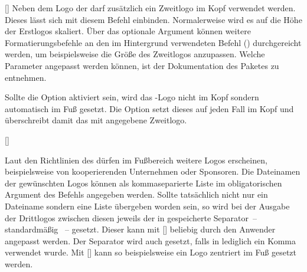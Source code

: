 \begin{Declaration*}{}
\begin{Declaration*}{}
\begin{Declaration*}{}
\begin{Declaration}{[\LParameter{}]}
\printdeclarationlist%
%
%
%
%
Neben dem Logo der \TnUD darf zusätzlich ein Zweitlogo im Kopf verwendet 
werden. Dieses lässt sich mit diesem Befehl einbinden. Normalerweise wird es 
auf die Höhe der Erstlogos skaliert. Über das optionale Argument können weitere 
Formatierungsbefehle an den im Hintergrund verwendeten Befehl 
() durchgereicht werden, um 
beispielsweise die Größe des Zweitlogos anzupassen. Welche Parameter angepasst 
werden können, ist der Dokumentation des Paketes  zu 
entnehmen.

Sollte die Option  aktiviert sein, wird das \DDC-Logo nicht im Kopf 
sondern automatisch im Fuß gesetzt. Die Option  setzt dieses 
auf jeden Fall im Kopf und überschreibt damit das mit  
angegebene Zweitlogo.
\end{Declaration}

\begin{Declaration}[v2.03]{%
  [\LParameter{}]%
}
\begin{Declaration}[v2.03]{}%
\printdeclarationlist%
%
%
%

Laut den Richtlinien des \CDs dürfen im Fußbereich weitere Logos erscheinen, 
beispielsweise von kooperierenden Unternehmen oder Sponsoren. Die Dateinamen 
der gewünschten Logos können als kommaseparierte Liste im obligatorischen 
Argument des Befehls  angegeben werden. Sollte tatsächlich 
nicht nur ein Dateiname sondern eine Liste übergeben worden sein, so wird bei 
der Ausgabe der Drittlogos zwischen diesen jeweils der in  
gespeicherte Separator~-- standardmäßig ~-- gesetzt. Dieser kann 
mit [\PParameter{\dots}] 
beliebig durch den Anwender angepasst werden. Der Separator wird auch gesetzt, 
falls in  lediglich ein Komma verwendet wurde. Mit 
[] kann so beispielsweise ein 
Logo zentriert im Fuß gesetzt werden.


\end{Declaration}
\end{Declaration}
\end{Declaration*}
\end{Declaration*}
\end{Declaration*}
